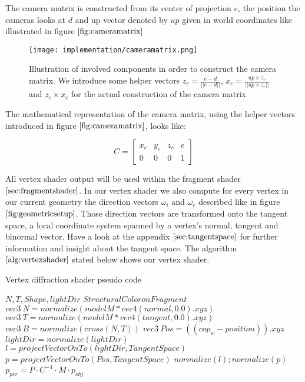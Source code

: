 The camera matrix is constructed from its center of projection $e$, the position the cameras looks at $d$ and up vector denoted by $up$ given in world coordinates like illustrated in figure $\ref{fig:cameramatrix}$

\begin{figure}[H]
  \centering
  \texttt{[image: implementation/cameramatrix.png]}
  \caption{Illustration of involved components in order to construct the camera matrix. We introduce some helper vectors $z_c = \frac{e-d}{||e-d||}$, $x_c = \frac{up \times z_c}{||up \times z_c||} $ and $z_c \times x_c$ for the actual construction of the camera matrix}
  \label{fig:cameramatrix}
\end{figure}

The mathematical representation of the camera matrix, using the helper vectors introduced in figure $\ref{fig:cameramatrix}$, looks like:

\begin{equation}
C = \begin{bmatrix} x_c & y_c & z_c & e \\ 0 & 0 & 0 & 1 \end{bmatrix}
\end{equation}

All vertex shader output will be used within the fragment shader $\ref{sec:fragmentshader}$. In our vertex shader we also compute for every vertex in our current geometry the direction vectors $\omega_i$ and $\omega_r$ described like in figure $\ref{fig:geometricsetup}$. Those direction vectors are transformed onto the tangent space, a local coordinate system spanned by a vertex's normal, tangent and binormal vector. Have a look at the appendix $\ref{sec:tangentspace}$ for further information and insight about the tangent space. The algorithm $\ref{alg:vertexshader}$ stated below shows our vertex shader.
  
\begin{algorithm}[H]
  \caption{Vertex diffraction shader pseudo code}
  \begin{algorithmic}
    \INPUT $N, T, Shape, lightDir$
    \MOUTPUT $Structural Color on Fragment$
      \State $ vec3 \ N = normalize(modelM * vec4(normal,0.0).xyz)$
      \State $ vec3 \ T = normalize(modelM * vec4(tangent,0.0).xyz)$
      \State $ vec3 \ B = normalize(cross(N, T))$
      \State $ vec3 \ Pos = ((cop_{w}-position)).xyz$
      \State $ lightDir = normalize(lightDir)$
      \State $ l = projectVectorOnTo(lightDir, TangentSpace)$
      \State $ p = projectVectorOnTo(Pos, TangentSpace)$
      \State $normalize(l); normalize(p)$
      \State $p_{per} = P \cdot C^{-1} \cdot M \cdot p_{obj}$
    \EndFor
  \end{algorithmic}
\label{alg:vertexshader}
\end{algorithm}

